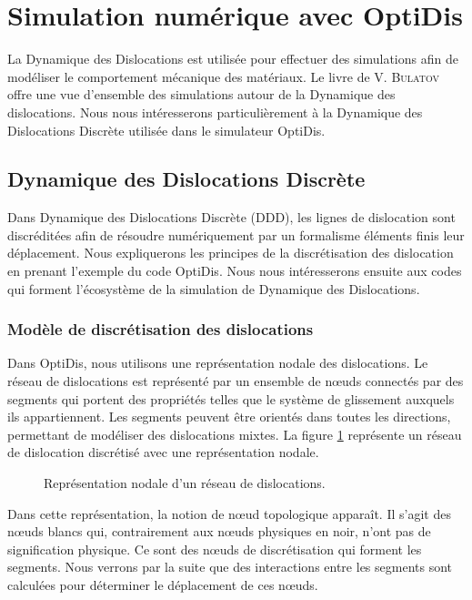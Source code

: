 \documentclass[11pt,class=article,float=false,crop=false]{standalone}
\begin{document}
\section{Simulation numérique avec OptiDis}

La Dynamique des Dislocations est utilisée pour effectuer des simulations afin de modéliser le comportement mécanique des matériaux. Le livre de \textsc{V. Bulatov} offre une vue d'ensemble des simulations autour de la Dynamique des dislocations. Nous nous intéresserons particulièrement à la Dynamique des Dislocations Discrète utilisée dans le simulateur OptiDis.


\subsection{Dynamique des Dislocations Discrète}

Dans Dynamique des Dislocations Discrète (DDD), les lignes de dislocation sont discréditées afin de résoudre numériquement par un formalisme éléments finis leur déplacement. Nous expliquerons les principes de la discrétisation des dislocation en prenant l'exemple du code OptiDis. Nous nous intéresserons ensuite aux codes qui forment l'écosystème de la simulation de Dynamique des Dislocations.

\subsubsection{Modèle de discrétisation des dislocations}

Dans OptiDis, nous utilisons une représentation nodale des dislocations. Le réseau de dislocations est représenté par un ensemble de nœuds connectés par des segments qui portent des propriétés telles que le système de glissement auxquels ils appartiennent. Les segments peuvent être orientés dans toutes les directions, permettant de modéliser des dislocations mixtes. La figure \ref{fig:representation_nodale} représente un réseau de dislocation discrétisé avec une représentation nodale.

\begin{figure}[H]
	\centering
	\caption{Représentation nodale d'un réseau de dislocations.}
	\label{fig:representation_nodale}
\end{figure}

Dans cette représentation, la notion de nœud topologique apparaît. Il s'agit des nœuds blancs qui, contrairement aux nœuds physiques en noir, n'ont pas de signification physique. Ce sont des nœuds de discrétisation qui forment les segments. Nous verrons par la suite que des interactions entre les segments sont calculées pour déterminer le déplacement de ces nœuds.
\end{document}
